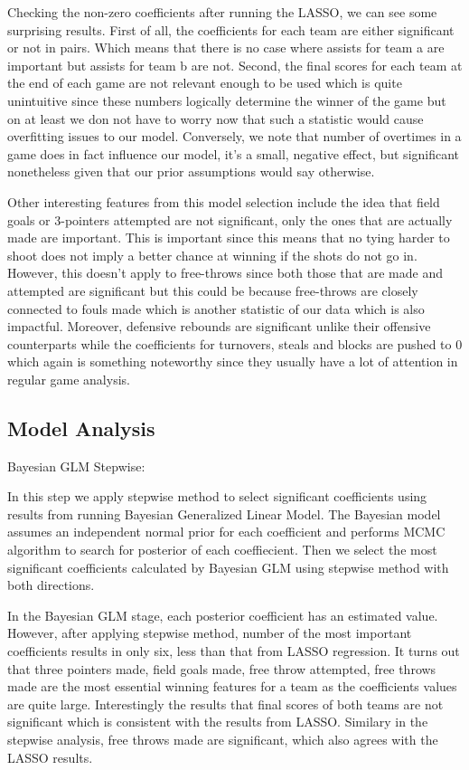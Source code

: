 \documentclass{article} %
\begin{document}
Checking the non-zero coefficients after running the LASSO, we can see some surprising results. 
First of all, the coefficients for each team are either significant or not in pairs. Which means that there is no case where assists for team a are important but assists for team b are not. Second, the final scores for each team at the end of each game are not relevant enough to be used which is quite unintuitive since these numbers logically determine the winner of the game but on at least we don not have to worry now that such a statistic would cause overfitting issues to our model. Conversely, we note that number of overtimes in a game does in fact influence our model, it's a small, negative effect, but significant nonetheless given that our prior assumptions would say otherwise. \

Other interesting features from this model selection include the idea that field goals or 3-pointers attempted are not significant, only the ones that are actually made are important. This is important since this means that no tying harder to shoot does not imply a better chance at winning if the shots do not go in. However, this doesn't apply to free-throws since both those that are made and attempted are significant but this could be because free-throws are closely connected to fouls made which is another statistic of our data which is also impactful. Moreover, defensive rebounds are significant unlike their offensive counterparts while the coefficients for turnovers, steals and blocks are pushed to 0 which again is something noteworthy since they usually have a lot of attention in regular game analysis.\

\subsection{Model Analysis}

Bayesian GLM Stepwise:

In this step we apply stepwise method to select significant coefficients using results from running Bayesian Generalized Linear Model. The Bayesian model assumes an independent normal prior for each coefficient and performs MCMC algorithm to search for posterior of each coeffiecient. Then we select the most significant coefficients calculated by Bayesian GLM using stepwise method with both directions.

In the Bayesian GLM stage, each posterior coefficient has an estimated value. However, after applying stepwise method, number of the most important coefficients results in only six, less than that from LASSO regression. It turns out that three pointers made, field goals made, free throw attempted, free throws made are the most essential winning features for a team as the coefficients values are quite large. Interestingly the results that final scores of both teams are not significant which is consistent with the results from LASSO. Similary in the stepwise analysis, free throws made are significant, which also agrees with the LASSO results.
\end{document}
